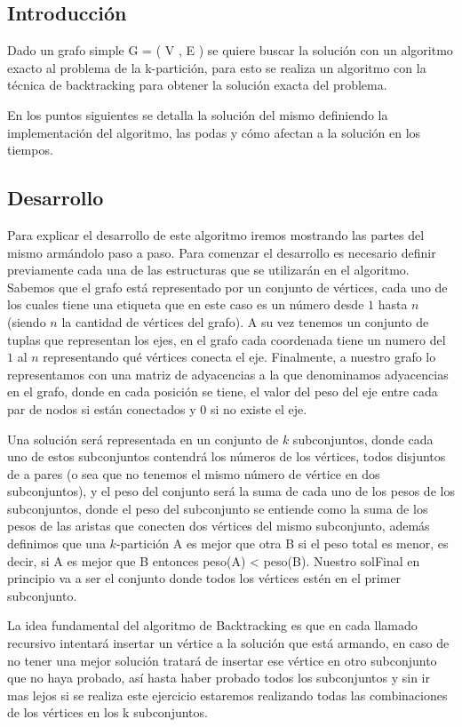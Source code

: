 \subsection{Introducción}

Dado un grafo simple G = ( V , E ) se quiere buscar la solución con un algoritmo exacto al problema de la k-partición, para esto se realiza un algoritmo con la técnica de backtracking para obtener la solución exacta del problema.

En los puntos siguientes se detalla la solución del mismo definiendo la implementación del algoritmo, las podas y  cómo afectan a la solución en los tiempos.

\subsection{Desarrollo}
Para explicar el desarrollo de este algoritmo iremos mostrando las partes del mismo armándolo paso a paso. Para comenzar el desarrollo es necesario definir previamente cada una de las estructuras que se utilizarán en el algoritmo. Sabemos que el grafo está representado por un conjunto de vértices, cada uno de los cuales tiene una etiqueta que en este caso es un número desde $1$ hasta $n$ (siendo $n$ la cantidad de vértices del grafo). A su vez tenemos un conjunto de tuplas que representan los ejes, en el grafo cada coordenada tiene un numero del $1$ al $n$ representando qué vértices conecta el eje. Finalmente, a nuestro grafo lo representamos con una matriz de adyacencias a la que denominamos adyacencias en el grafo, donde en cada posición se tiene, el valor del peso del eje entre cada par de nodos si están conectados y $0$ si no existe el eje.

Una solución será representada en un conjunto de $k$ subconjuntos, donde cada uno de estos subconjuntos contendrá los números de los vértices, todos disjuntos de a pares (o sea que no tenemos el mismo número de vértice en dos subconjuntos), y el peso del conjunto será la suma de cada uno de los pesos de los subconjuntos, donde el peso del subconjunto se entiende como la suma de los pesos de las aristas que conecten dos vértices del mismo subconjunto, además definimos que una $k$-partición A es mejor que otra B si el peso total es menor, es decir, si A es mejor que B entonces peso(A) < peso(B). Nuestro solFinal en principio va a ser el conjunto donde todos los vértices estén en el primer subconjunto.

La idea fundamental del algoritmo de Backtracking es que en cada llamado recursivo intentará insertar un vértice a la solución que está armando, en caso de no tener una mejor solución tratará de insertar ese vértice en otro subconjunto que no haya probado, así hasta haber probado todos los subconjuntos y sin ir mas lejos si se realiza este ejercicio estaremos realizando todas las combinaciones de los vértices en los k subconjuntos.	

